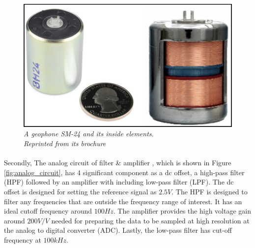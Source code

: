 \begin{figure}[H]
  \centering
  \caption[A geophone SM-24 and its inside elements.]{\emph{A geophone SM-24 and its inside elements. \\Reprinted from its brochure }}\label{fig:seismic}
  \includegraphics[scale = 0.3]{figures/seismic.jpg}  
\end{figure}

\paragraph{}
Secondly, The analog circuit of filter \& amplifier , which is shown in Figure \ref{fig:analog_circuit}, has 4 significant component as a dc offset, a high-pass filter (HPF) followed by an amplifier with including low-pass filter (LPF). The dc offset is designed for setting the reference signal as $2.5 V$. The HPF is designed to filter any frequencies that are outside the frequency range of interest. It has an ideal cutoff frequency around $100 Hz$. The amplifier provides the high voltage gain around $200 V/V$ needed for preparing the data to be sampled at high resolution at the analog to digital converter (ADC). Lastly, the low-pass filter has cut-off frequency at $100 kHz$.

